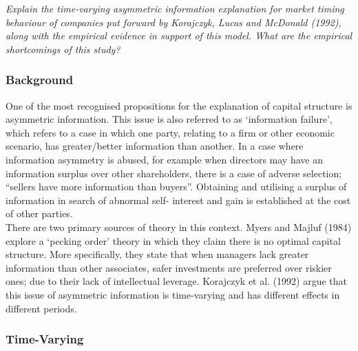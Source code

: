 \documentclass[11pt, english]{article}
\begin{document}
	\textit{Explain the time-varying asymmetric information explanation for market timing behaviour of companies put forward by Korajczyk, Lucas and McDonald (1992), along with the empirical evidence in support of this model. What are the empirical shortcomings of this study?}

		\subsubsection*{Background}

	One of the most recognised propositions for the explanation of capital structure is asymmetric information. This issue is also referred to as ‘information failure’, which refers to a case in which one party, relating to a firm or other economic scenario, has greater/better information than another. In a case where information asymmetry is abused, for example when directors may have an information surplus over other shareholders, there is a case of adverse selection; “sellers have more information than buyers”. Obtaining and utilising a surplus of information in search of abnormal self- interest and gain is established at the cost of other parties.\\

	There are two primary sources of theory in this context. Myers and Majluf (1984) explore a ‘pecking order’ theory in which they claim there is no optimal capital structure. More specifically, they state that when managers lack greater information than other associates, safer investments are preferred over riskier ones; due to their lack of intellectual leverage. Korajczyk et al. (1992) argue that this issue of asymmetric information is time-varying and has different effects in different periods.

		\subsubsection*{Time-Varying}
\end{document}

